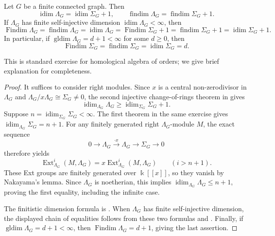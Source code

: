 \documentclass[a4paper,leqno]{amsart}
\begin{document}
\begin{prop}\label{prop:homological-dimensions-tiled-order}
Let $G$ be a finite connected graph.  Then
\[
\operatorname{idim}\Lambda_G
=\operatorname{idim}\Sigma_G+1, \qquad
\operatorname{findim}\Lambda_G
=\operatorname{findim}\Sigma_G+1.
\]
If $\Lambda_G$ has finite self-injective dimension  $\operatorname{idim}\Lambda_G<\infty$, then
$$\operatorname{Findim}\Lambda_G
=\operatorname{findim}\Lambda_G
=\operatorname{idim}\Lambda_G
=\operatorname{Findim}\Sigma_G+1
=\operatorname{findim}\Sigma_G+1
=\operatorname{idim}\Sigma_G+1.$$
In particular, if $\operatorname{gldim}\Lambda_G=d+1<\infty$ for some $d\ge 0$, then
\[
\operatorname{Findim}\Sigma_G=\operatorname{findim}\Sigma_G=\operatorname{idim}\Sigma_G=d.
\]
\end{prop}
This is standard exercise for homological algebra of orders; we give brief explanation for completeness.
\begin{proof}
It suffices to consider right modules. Since $x$ is a central non-zerodivisor in $\Lambda_G$ and $\Lambda_G/x\Lambda_G\cong\Sigma_G\neq0$, the second injective change-of-rings theorem in \cite[Exercise~4.3.3]{Wei94} gives
\[
 \operatorname{idim}_{\Lambda_G}\Lambda_G
 \geq\operatorname{idim}_{\Sigma_G}\Sigma_G+1.
\]
Suppose $n=\operatorname{idim}_{\Sigma_G}\Sigma_G<\infty$. The first theorem in the same exercise gives $\operatorname{idim}_{\Lambda_G}\Sigma_G=n+1$. For any finitely generated right $\Lambda_G$-module $M$, the exact sequence
\[
 0\longrightarrow\Lambda_G\xrightarrow{\cdot x}\Lambda_G
 \longrightarrow\Sigma_G\longrightarrow0
\]
therefore yields
\[
 \operatorname{Ext}^i_{\Lambda_G}(M,\Lambda_G)
 =x\operatorname{Ext}^i_{\Lambda_G}(M,\Lambda_G)
 \qquad(i>n+1).
\]
These Ext groups are finitely generated over $\Bbbk[[x]]$, so they vanish by Nakayama's lemma. Since $\Lambda_G$ is noetherian, this implies $\operatorname{idim}_{\Lambda_G}\Lambda_G\leq n+1$, proving the first equality, including the infinite case.

The finitistic dimension formula is \cite[Proposition~4.1]{GHZ98}. When $\Lambda_G$ has finite self-injective dimension, the displayed chain of equalities follows from these two formulas and \cite[Propositions~1.2 and~1.3]{GHZ98}. Finally, if $\operatorname{gldim}\Lambda_G=d+1<\infty$, then $\operatorname{Findim}\Lambda_G=d+1$, giving the last assertion.
\end{proof}

\end{document}
